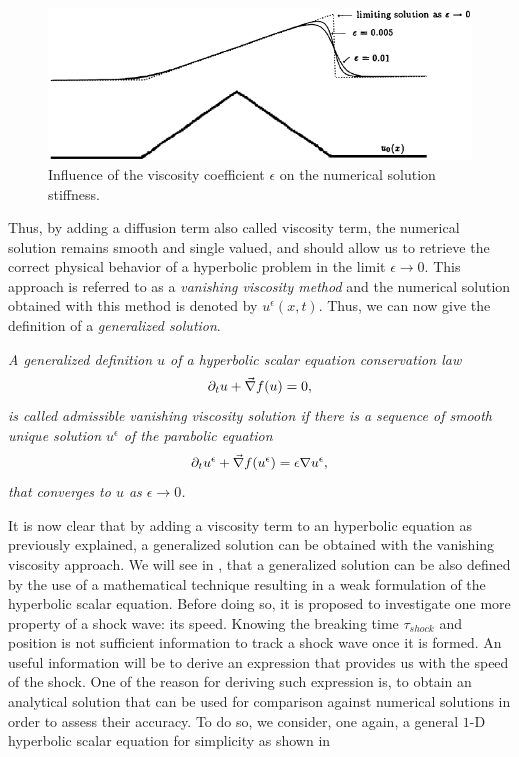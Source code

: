 %
\begin{figure}[H]
\centering
\includegraphics[width=\textwidth]{figures/effect_of_epsilon.png}
\caption{Influence of the viscosity coefficient $\epsilon$ on the numerical solution stiffness.}
\label{fig:epsilon}
\end{figure}
%
Thus, by adding a diffusion term also called viscosity term, the numerical solution remains smooth and single valued, and should allow us to retrieve the correct physical behavior of a hyperbolic problem in the limit $\epsilon \to 0$. This approach is referred to as a \emph{vanishing viscosity method} and the numerical solution obtained with this method is denoted by $u^{\epsilon}(x,t)$. Thus, we can now give the definition of a \emph{generalized solution}. 
%
\begin{definition}
\emph{
A generalized definition $u$ of a hyperbolic scalar equation conservation law 
\begin{equation}
\partial_t u + \vec{\nabla} f(u) = 0, \nonumber
\end{equation}
is called admissible vanishing viscosity solution if there is a sequence of smooth unique solution $u^{\epsilon}$ of the parabolic equation 
\begin{equation}
\partial_t u^{\epsilon} +  \vec{\nabla} f(u^{\epsilon}) = \epsilon \nabla u^{\epsilon}, \nonumber
\end{equation}
that converges to $u$ as $\epsilon \to 0$.}
\end{definition}
%
It is now clear that by adding a viscosity term to an hyperbolic equation as previously explained, a generalized solution can be obtained with the vanishing viscosity approach. We will see in , that a generalized solution can be also defined by the use of a mathematical technique resulting in a weak formulation of the hyperbolic scalar equation. Before doing so, it is proposed to investigate one more property of a shock wave: its speed. Knowing the breaking time $\tau_{shock}$ and position is not sufficient information to track a shock wave once it is formed. An useful information will be to derive an expression that provides us with the speed of the shock. One of the reason for deriving such expression is, to obtain an analytical solution that can be used for comparison against numerical solutions in order to assess their accuracy. To do so, we consider, one again, a general $1$-D hyperbolic scalar equation for simplicity as shown in 
